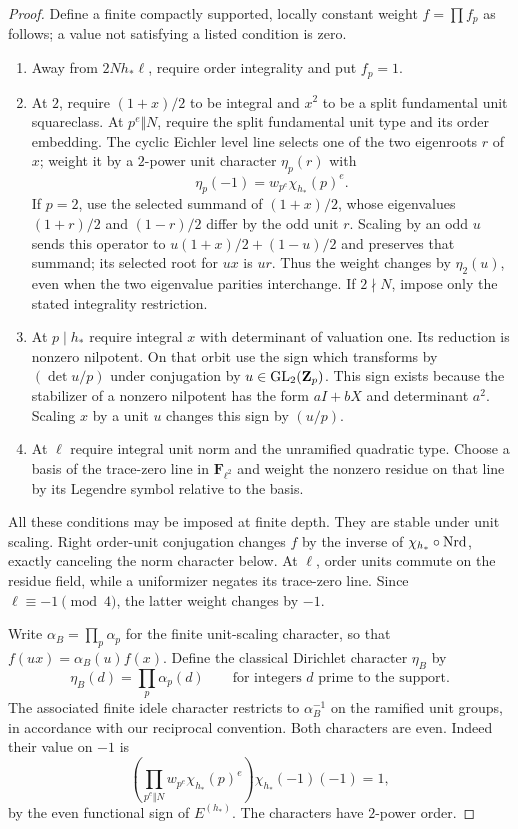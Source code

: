 \begin{proof}
Define a finite compactly supported, locally constant weight
$f=\prod f_p$ as follows; a value not satisfying a listed condition is zero.
\begin{enumerate}[label=\textup{(\alph*)}]
\item Away from $2Nh_*\ell$, require order integrality and put $f_p=1$.
\item At $2$, require $(1+x)/2$ to be integral and $x^2$ to be a split
fundamental unit squareclass.  At $p^e\Vert N$, require the split
fundamental unit type and its order embedding.  The cyclic Eichler
level line selects one of the two eigenroots $r$ of $x$; weight it by a
$2$-power unit character $\eta_p(r)$ with
\[
                   \eta_p(-1)=w_{p^e}\chi_{h_*}(p)^e.
\]
If $p=2$, use the selected summand of $(1+x)/2$, whose eigenvalues
$(1+r)/2$ and $(1-r)/2$ differ by the odd unit $r$. Scaling by an odd
$u$ sends this operator to
$u(1+x)/2+(1-u)/2$ and preserves that summand; its selected root for
$ux$ is $ur$. Thus the weight changes by $\eta_2(u)$, even when the
two eigenvalue parities interchange. If $2\nmid N$, impose only the
stated integrality restriction.
\item At $p\mid h_*$ require integral $x$ with determinant of valuation
one.  Its reduction is nonzero nilpotent.  On that orbit use the sign
which transforms by $(\det u/p)$ under conjugation by
$u\in\operatorname{GL}_2(\mathbf Z_p)$.  This sign exists because the stabilizer of
a nonzero nilpotent has the form $aI+bX$ and determinant $a^2$.
Scaling $x$ by a unit $u$ changes this sign by $(u/p)$.
\item At $\ell$ require integral unit norm and the unramified quadratic
type.  Choose a basis of the trace-zero line in $\mathbf F_{\ell^2}$
and weight the nonzero residue on that line by its Legendre symbol
relative to the basis.
\end{enumerate}
All these conditions may be imposed at finite depth.  They are stable
under unit scaling.  Right order-unit conjugation changes $f$ by the
inverse of $\chi_{h_*}\circ\operatorname{Nrd}$, exactly canceling the norm character
below.  At $\ell$, order units commute on the residue field, while a
uniformizer negates its trace-zero line.  Since $\ell\equiv-1\pmod4$,
the latter weight changes by $-1$.

Write $\alpha_B=\prod_p\alpha_p$ for the finite unit-scaling
character, so that $f(ux)=\alpha_B(u)f(x)$.  Define the classical
Dirichlet character $\eta_B$ by
\[
 \eta_B(d)=\prod_p\alpha_p(d)
 \qquad\text{for integers }d\text{ prime to the support}.
\]
The associated finite idele character restricts to $\alpha_B^{-1}$
on the ramified unit groups, in accordance with our reciprocal
convention.  Both characters are even.  Indeed their value on $-1$ is
\[
 \left(\prod_{p^e\Vert N}w_{p^e}\chi_{h_*}(p)^e\right)
                      \chi_{h_*}(-1)(-1)=1,
\]
by the even functional sign of $E^{(h_*)}$.  The characters have
$2$-power order.


\end{proof}
